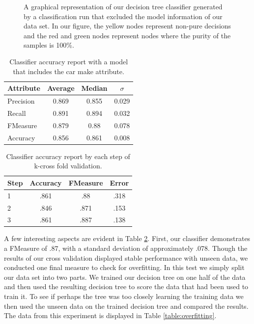 \documentclass[letterpaper,12pt]{article}
\begin{document}
\begin{figure}[H]
  \caption{A graphical representation of our decision tree classifier generated by a classification run that excluded the model information of our data set. In our figure, the yellow nodes represent non-pure decisions and the red and green nodes represent nodes where the purity of the samples is 100\%.}
  \label{fig:tree}
\end{figure}



\begin{table}[H]
  \centering
\begin{tabular}{ | l | c | c | c |}
  \hline
  Attribute &  Average & Median & $\sigma$ \\
  \hline
  Precision & 0.869 & 0.855 & 0.029 \\
  \hline
  Recall  &   0.891 & 0.894 & 0.032 \\ 
  \hline
  FMeasure &  0.879 & 0.88 & 0.078 \\
  \hline
  Accuracy & 0.856 & 0.861 & 0.008 \\
  \hline
\end{tabular}
\caption{Classifier accuracy report with a model that includes the car make attribute.}
\label{table:with-model}
\end{table}




\begin{table}[H]
  \centering
\begin{tabular}{ | l | c | c | c |}
  \hline
  Step & Accuracy & FMeasure & Error \\
  \hline
  1 & .861 & .88 & .318\\
  \hline
  2    & .846 & .871 & .153 \\
  \hline
  3  & .861 & .887 & .138 \\
  \hline
\end{tabular}
\caption{Classifier accuracy report by each step of k-cross fold validation.}
\label{table:with-model}
\end{table}


A few interesting aspects are evident in Table \ref{table:with-model}. First, our classifier demonstrates a FMeasure of $.87$, with a standard deviation of approximately .078. Though the results of our cross validation displayed stable performance with unseen data, we conducted one final measure to check for overfitting. In this test we simply split our data set into two parts. We trained our decision tree on one half of the data and then used the resulting decision tree to score the data that had been used to train it. To see if perhaps the tree was too closely learning the training data we then used the unseen data on the trained decision tree and compared the results. The data from this experiment is displayed in Table \ref{table:overfitting}. 
\end{document}
